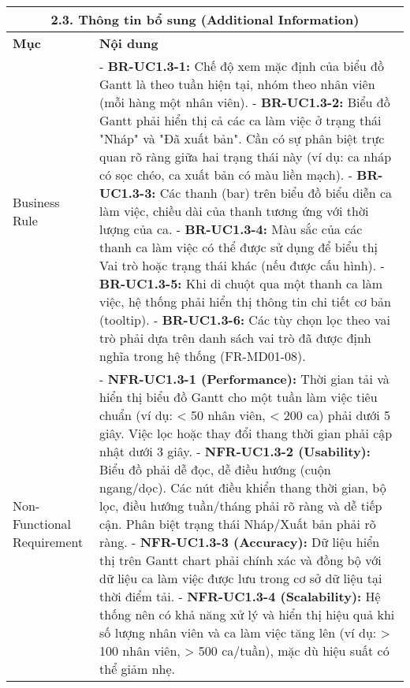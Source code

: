 \begin{longtable}{|m{4cm}|p{11cm}|}
\hline
\multicolumn{2}{|c|}{\textbf{2.3. Thông tin bổ sung (Additional Information)}} \\
\hline
\textbf{Mục} & \textbf{Nội dung} \\
\hline
Business Rule & - \textbf{BR-UC1.3-1:} Chế độ xem mặc định của biểu đồ Gantt là theo tuần hiện tại, nhóm theo nhân viên (mỗi hàng một nhân viên). \newline - \textbf{BR-UC1.3-2:} Biểu đồ Gantt phải hiển thị cả các ca làm việc ở trạng thái "Nháp" và "Đã xuất bản". Cần có sự phân biệt trực quan rõ ràng giữa hai trạng thái này (ví dụ: ca nháp có sọc chéo, ca xuất bản có màu liền mạch). \newline - \textbf{BR-UC1.3-3:} Các thanh (bar) trên biểu đồ biểu diễn ca làm việc, chiều dài của thanh tương ứng với thời lượng của ca. \newline - \textbf{BR-UC1.3-4:} Màu sắc của các thanh ca làm việc có thể được sử dụng để biểu thị Vai trò hoặc trạng thái khác (nếu được cấu hình). \newline - \textbf{BR-UC1.3-5:} Khi di chuột qua một thanh ca làm việc, hệ thống phải hiển thị thông tin chi tiết cơ bản (tooltip). \newline - \textbf{BR-UC1.3-6:} Các tùy chọn lọc theo vai trò phải dựa trên danh sách vai trò đã được định nghĩa trong hệ thống (FR-MD01-08). \\
\hline
Non-Functional Requirement & - \textbf{NFR-UC1.3-1 (Performance):} Thời gian tải và hiển thị biểu đồ Gantt cho một tuần làm việc tiêu chuẩn (ví dụ: < 50 nhân viên, < 200 ca) phải dưới 5 giây. Việc lọc hoặc thay đổi thang thời gian phải cập nhật dưới 3 giây. \newline - \textbf{NFR-UC1.3-2 (Usability):} Biểu đồ phải dễ đọc, dễ điều hướng (cuộn ngang/dọc). Các nút điều khiển thang thời gian, bộ lọc, điều hướng tuần/tháng phải rõ ràng và dễ tiếp cận. Phân biệt trạng thái Nháp/Xuất bản phải rõ ràng. \newline - \textbf{NFR-UC1.3-3 (Accuracy):} Dữ liệu hiển thị trên Gantt chart phải chính xác và đồng bộ với dữ liệu ca làm việc được lưu trong cơ sở dữ liệu tại thời điểm tải. \newline - \textbf{NFR-UC1.3-4 (Scalability):} Hệ thống nên có khả năng xử lý và hiển thị hiệu quả khi số lượng nhân viên và ca làm việc tăng lên (ví dụ: > 100 nhân viên, > 500 ca/tuần), mặc dù hiệu suất có thể giảm nhẹ. \\
\hline

\end{longtable}


